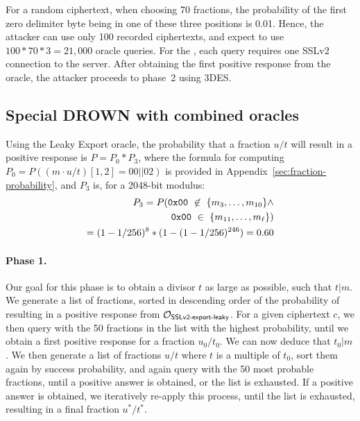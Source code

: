 For a random ciphertext, when choosing 70 fractions, the probability of the
first zero delimiter byte being in one of these three positions is 0.01.
Hence, the attacker can use only 100 recorded ciphertexts, and expect to use
$100 * 70 * 3 = 21,000$ oracle queries. For the \tOracleSSLclear, each
query requires one SSLv2 connection to the server.
After obtaining the first positive response from the oracle, the attacker
proceeds to phase~2 using 3DES.

\subsection{Special DROWN with combined oracles}
\label{sec:special-both}

Using the Leaky Export oracle, the probability that a fraction $u/t$ will result
in a positive response is $P = P_0 * P_3$, where the formula for
computing $P_0 = P((m \cdot u/t)[1,2] = 00||02)$ is provided in Appendix~\ref{sec:fraction-probability},
and $P_3$ is, for a 2048-bit modulus:
\begin{equation}
\begin{aligned}
P_3 = P(
{\tt 0x00} \text{ } \not \in \text{ } \{m_3, \ldots,m_{10}\} \wedge \\
{\tt 0x00} \text{ } \in \text{ } \{m_{11}, \ldots,m_{\ell}\}) \\
 = (1 - 1/256)^{8} * (1 - (1 - 1/256)^{246}) = 0.60
\end{aligned}
\end{equation}


\paragraph{Phase 1.}
Our goal for this phase is to obtain a divisor $t$ as large as possible,
such that $t|m$. We generate a list of
fractions, sorted in descending order of the probability of
resulting in a positive response from $\mathcal{O}_\textsf{SSLv2-export-leaky}$. For a given ciphertext $c$, we then query with
the 50 fractions in the list with the highest probability,
until we obtain a first positive response for a fraction $u_0/t_0$.
We can now deduce that $t_0|m$.
We then generate a list of fractions $u/t$ where $t$ is a multiple of $t_0$, sort them again
by success probability, and again query with the 50 most probable fractions, until a positive answer is obtained,
or the list is exhausted.
If a positive answer is obtained, we iteratively re-apply this process,
until the list is exhausted, resulting in a final fraction $u^*/t^*$.

